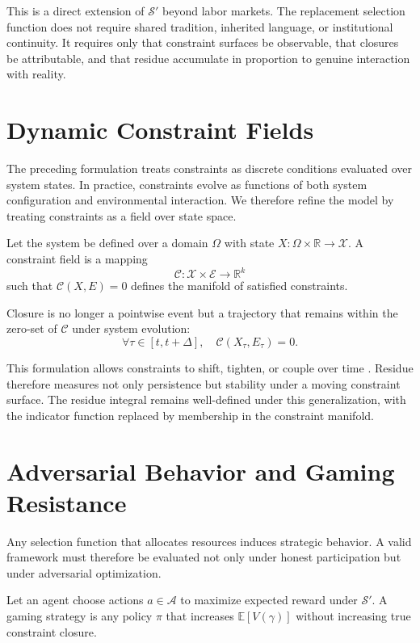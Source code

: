 \documentclass[12pt]{article}
\begin{document}
This is a direct extension of $\mathcal{S}'$ beyond labor markets. The
replacement selection function does not require shared tradition,
inherited language, or institutional continuity. It requires only that
constraint surfaces be observable, that closures be attributable, and
that residue accumulate in proportion to genuine interaction with
reality.

\section{Dynamic Constraint Fields}

The preceding formulation treats constraints as discrete conditions
evaluated over system states. In practice, constraints evolve as
functions of both system configuration and environmental interaction.
We therefore refine the model by treating constraints as a field over
state space.

Let the system be defined over a domain $\Omega$ with state
$X : \Omega \times \mathbb{R} \rightarrow \mathcal{X}$. A constraint
field is a mapping
\[
  \mathcal{C} : \mathcal{X} \times \mathcal{E} \rightarrow \mathbb{R}^k
\]
such that $\mathcal{C}(X,E)=0$ defines the manifold of satisfied
constraints.

Closure is no longer a pointwise event but a trajectory that remains
within the zero-set of $\mathcal{C}$ under system evolution:
\[
  \forall \tau \in [t,t+\Delta], \quad
  \mathcal{C}(X_\tau, E_\tau) = 0.
\]

This formulation allows constraints to shift, tighten, or couple over
time \cite{kauffman1993}. Residue therefore measures not only persistence
but stability under a moving constraint surface. The residue integral remains
well-defined under this generalization, with the indicator function
replaced by membership in the constraint manifold.

\section{Adversarial Behavior and Gaming Resistance}

Any selection function that allocates resources induces strategic
behavior. A valid framework must therefore be evaluated not only under
honest participation but under adversarial optimization.

Let an agent choose actions $a \in \mathcal{A}$ to maximize expected
reward under $\mathcal{S}'$. A gaming strategy is any policy $\pi$
that increases $\mathbb{E}[V(\gamma)]$ without increasing true
constraint closure.
\end{document}
